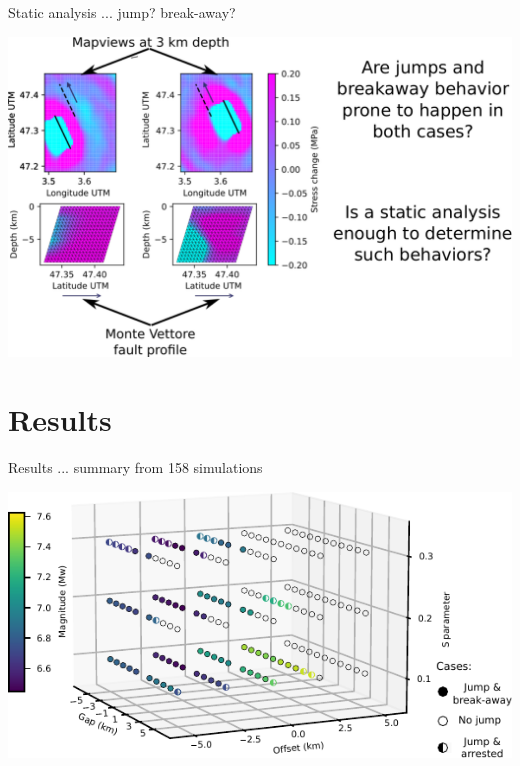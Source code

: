 \documentclass{beamer}
\begin{document}
\begin{frame}
 {Static analysis ... jump? break-away?}
 
 \begin{center}
 \begin{minipage}{1\linewidth}
  \includegraphics[width=1\linewidth]{images/static_analysis.pdf}
 \end{minipage}
 \end{center}
 
\end{frame}


\section{Results}


\begin{frame}
 {Results ... summary from 158 simulations}
 
 \vskip -0.5cm
  \includegraphics[width=1\linewidth]{images/tests_shmax340}
 
\end{frame}
\end{document}
